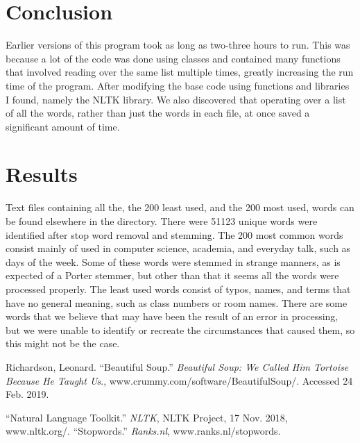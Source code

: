 \documentclass[12pt]{article}
\begin{document}
\section{Conclusion}
Earlier versions of this program took as long as two-three hours to run. This was because a lot of the code was done using classes and contained many functions that involved reading over the same list multiple times, greatly increasing the run time of the program. After modifying the base code using functions and libraries I found, namely the NLTK library. We also discovered that operating over a list of all the words, rather than just the words in each file, at once saved a significant amount of time.
\section{Results}
Text files containing all the, the 200 least used, and the 200 most used, words can be found elsewhere in the directory. There were 51123 unique words were identified after stop word removal and stemming. The 200 most common words consist mainly of used in computer science, academia, and everyday talk, such as days of the week. Some of these words were stemmed in strange manners, as is expected of a Porter stemmer, but other than that it seems all the words were processed properly. The least used words consist of typos, names, and terms that have no general meaning, such as class numbers or room names. There are some words that we believe that may have been the result of an error in processing, but we were unable to identify or recreate the circumstances that caused them, so this might not be the case.

\begin{thebibliography}{9}
Richardson, Leonard. “Beautiful Soup.” \textit{Beautiful Soup: We Called Him Tortoise Because He Taught Us}., www.crummy.com/software/BeautifulSoup/. Accessed 24 Feb. 2019.

“Natural Language Toolkit.” \textit{NLTK}, NLTK Project, 17 Nov. 2018, www.nltk.org/.
“Stopwords.” \textit{Ranks.nl}, www.ranks.nl/stopwords.

\end{thebibliography}
\end{document}
